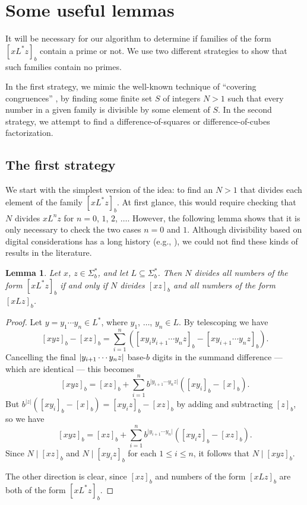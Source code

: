 \documentclass[12pt]{article}
\DeclarePairedDelimiter\abs{\lvert}{\rvert}
\theoremstyle{plain}
\newtheorem{lemma}[theorem]{Lemma}
\theoremstyle{definition}
\theoremstyle{remark}
\newcommand{\0}{\mathtt{0}}
\newcommand{\1}{\mathtt{1}}
\newcommand{\2}{\mathtt{2}}
\newcommand{\3}{\mathtt{3}}
\newcommand{\4}{\mathtt{4}}
\newcommand{\5}{\mathtt{5}}
\newcommand{\6}{\mathtt{6}}
\newcommand{\7}{\mathtt{7}}
\newcommand{\8}{\mathtt{8}}
\newcommand{\9}{\mathtt{9}}
\begin{document}
\section{Some useful lemmas}\label{seclemmas}
It will be necessary for our algorithm to determine if families of the
form $[xL^*z]_b$ contain a prime or not.  We use two different strategies
to show that such families contain no primes.

In the first strategy, we mimic the well-known technique of ``covering
congruences'' \cite{Choi},
by finding some finite set $S$ of integers $N > 1$ such that
every number in a given family is divisible by some element of $S$.
In the second strategy, we attempt to find a
difference-of-squares or difference-of-cubes factorization.

\subsection{The first strategy}\label{subsecfirststrat}

We start with the simplest version of the idea:  to find 
an $N > 1$ that divides each element of the family $[xL^*z]_b$.
At first glance, this would require
checking that $N$ divides $xL^nz$ for $n=0$, $1$, $2$, $\dotsc$.
However, the following lemma shows that it is only necessary to check
the two cases $n=0$ and $1$.  Although divisibility based on digital
considerations has a long history (e.g., \cite[Chap.~XII]{Dick}),
we could not find these kinds of results in the literature.

\begin{lemma}\label{lemone}
Let $x$, $z\in \Sigma^*_b$, and let $L\subseteq\Sigma^*_b$.
Then 
$N$ divides all numbers of the form $[xL^*z]_b$
if and only if 
$N$ divides $[xz]_b$ and all numbers of the form $[xLz]_b$.
\end{lemma}
\begin{proof}%
Let $y=y_1\dotsm y_n\in L^*$, where $y_1$, $\dotsc$, $y_n\in L$.  
By telescoping we have
\[ [xyz]_b - [xz]_b = \sum_{i=1}^{n}([xy_{i}y_{i+1}\dotsm y_n z]_b-[xy_{i+1}\dotsm y_n z]_b) . \]
Cancelling the final $\abs{y_{i+1}\dotsm y_nz}$ base-$b$ digits in the summand difference ---
which are identical --- this becomes
\[ [xyz]_b = [xz]_b + \sum_{i=1}^{n}b^{\lvert{y_{i+1}\dotsm y_n z}\rvert}([xy_i]_b-[x]_b) . \]
But $b^{\lvert z\rvert}([xy_i]_b-[x]_b)=[xy_iz]_b-[xz]_b$ by 
adding and subtracting $[z]_b$, so we have
\[ [xyz]_b = [xz]_b + \sum_{i=1}^{n}b^{\vert{y_{i+1}\dotsm y_n}\rvert}([xy_iz]_b-[xz]_b) . \]
Since $N\mid[xz]_b$ and $N\mid[xy_iz]_b$ for each $1\leq i\leq n$,
 it follows that $N\mid[xyz]_b$.
 
The other direction is clear, since $[xz]_b$ and numbers of the 
form $[xLz]_b$ are both of the form $[xL^*z]_b$.
\end{proof}
\end{document}
